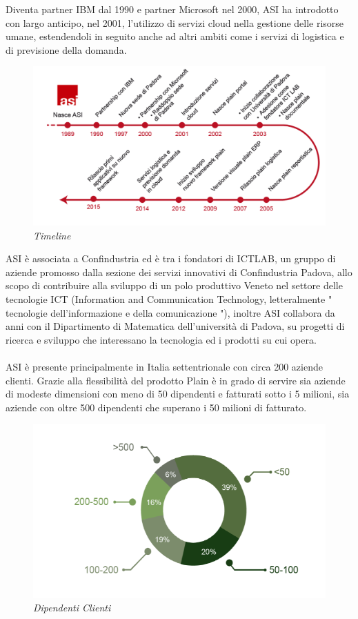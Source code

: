 Diventa partner IBM dal 1990 e partner Microsoft nel 2000, ASI ha introdotto con largo anticipo, nel 2001, l'utilizzo di servizi cloud nella gestione delle risorse umane, estendendoli in seguito anche ad altri ambiti come i servizi di logistica e di previsione della domanda.

\begin{figure}[ht]
	\centering
	\includegraphics[scale=0.25]{immagini/azienda/timeline}
	\caption{\textit{\textit{Timeline \asi}}}
\end{figure}\FloatBarrier

ASI è associata a Confindustria ed è tra i fondatori di ICTLAB, un gruppo di aziende promosso dalla sezione dei servizi innovativi di Confindustria Padova, allo scopo di contribuire alla sviluppo di un polo produttivo Veneto nel settore delle tecnologie ICT (Information and Communication Technology, letteralmente " tecnologie dell'informazione e della comunicazione "), inoltre ASI collabora da anni con il Dipartimento di Matematica dell'università di Padova, su progetti di ricerca e sviluppo che interessano la tecnologia ed i prodotti su cui opera.
\\\\
ASI è presente principalmente in Italia settentrionale con circa 200 aziende clienti. Grazie alla flessibilità del prodotto Plain è in grado di servire sia aziende di modeste dimensioni con meno di 50 dipendenti e fatturati sotto i 5 milioni, sia aziende con oltre 500 dipendenti che superano i 50 milioni di fatturato.

\begin{figure}[ht]
	\centering
	\includegraphics[scale=0.35]{immagini/azienda/dipendenti_clienti}
	\caption{\textit{Dipendenti Clienti \asi}}
\end{figure}\FloatBarrier

